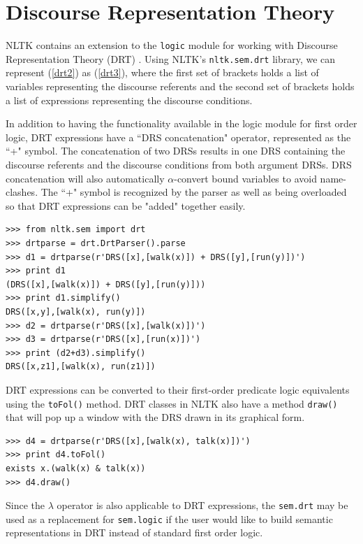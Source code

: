 \documentclass[11pt]{article}
\newcommand{\dhgdrs}[2]
{
    {
    \it
    \begin{tabular}{|l|}
    \hline
    ~ \vspace{-2ex} \\
    #1
    \\
    ~ \vspace{-2ex} \\
    \hline
    ~ \vspace{-2ex} \\
    #2
    \\
    ~ \\    %
    \hline
    \end{tabular}
    }
}
\newcommand{\dhgcode}[1]{{\tt #1}}
\begin{document}
\section{Discourse Representation Theory}
NLTK contains an extension to the \dhgcode{logic} module for working with Discourse Representation Theory (DRT) \cite{KampReyle}.  Using NLTK's \dhgcode{nltk.sem.drt} library, we can represent (\ref{drt2}) as (\ref{drt3}), where the first set of brackets holds a list of variables representing the discourse referents and the second set of brackets holds a list of expressions representing the discourse conditions.

\enumsentence{\label{drt2} \dhgdrs{j,d}{(John = j)\\dog(d)\\sees(j,d)}}
\enumsentence{\label{drt3} \dhgcode{DRS([j,d],[(John = j), dog(d), sees(j,d)])}}

In addition to having the functionality available in the logic module for first order logic, DRT expressions have a ``DRS concatenation" operator, represented as the ``+" symbol.  The concatenation of two DRSs results in one DRS containing the discourse referents and the discourse conditions from both argument DRSs.  DRS concatenation will also automatically $\alpha$-convert bound variables to avoid name-clashes.  The ``+" symbol is recognized by the parser as well as being overloaded so that DRT expressions can be "added" together easily.

\begin{verbatim}
>>> from nltk.sem import drt
>>> drtparse = drt.DrtParser().parse
>>> d1 = drtparse(r'DRS([x],[walk(x)]) + DRS([y],[run(y)])')
>>> print d1
(DRS([x],[walk(x)]) + DRS([y],[run(y)]))
>>> print d1.simplify()
DRS([x,y],[walk(x), run(y)])
>>> d2 = drtparse(r'DRS([x],[walk(x)])')
>>> d3 = drtparse(r'DRS([x],[run(x)])')
>>> print (d2+d3).simplify()
DRS([x,z1],[walk(x), run(z1)])
\end{verbatim}

DRT expressions can be converted to their first-order predicate logic equivalents using the \dhgcode{toFol()} method.  DRT classes in NLTK also have a method \dhgcode{draw()} that will pop up a window with the DRS drawn in its graphical form.

\begin{verbatim}
>>> d4 = drtparse(r'DRS([x],[walk(x), talk(x)])')
>>> print d4.toFol()
exists x.(walk(x) & talk(x))
>>> d4.draw()
\end{verbatim}

Since the $\lambda$ operator is also applicable to DRT expressions, the \dhgcode{sem.drt} may be used as a replacement for \dhgcode{sem.logic} if the user would like to build semantic representations in DRT instead of standard first order logic.
\end{document}
